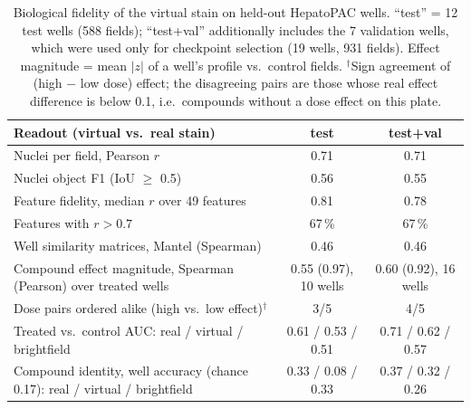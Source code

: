\documentclass[11pt,a4paper]{article}
\begin{document}
\begin{table}[H]
\centering\small
\caption{Biological fidelity of the virtual stain on held-out HepatoPAC wells. ``test'' = 12 test wells (588 fields); ``test+val'' additionally includes the 7 validation wells, which were used only for checkpoint selection (19 wells, 931 fields). Effect magnitude = mean $|z|$ of a well's profile vs.\ control fields. $^\dagger$Sign agreement of (high $-$ low dose) effect; the disagreeing pairs are those whose real effect difference is below 0.1, i.e.\ compounds without a dose effect on this plate.}
\label{tab:downstream}
\begin{tabular}{lcc}
\toprule
Readout (virtual vs.\ real stain) & test & test+val \\
\midrule
Nuclei per field, Pearson $r$ & 0.71 & 0.71 \\
Nuclei object F1 (IoU $\ge$ 0.5) & 0.56 & 0.55 \\
Feature fidelity, median $r$ over 49 features & 0.81 & 0.78 \\
Features with $r > 0.7$ & 67\,\% & 67\,\% \\
Well similarity matrices, Mantel (Spearman) & 0.46 & 0.46 \\
Compound effect magnitude, Spearman (Pearson) over treated wells & 0.55 (0.97), 10 wells & 0.60 (0.92), 16 wells \\
Dose pairs ordered alike (high vs.\ low effect)$^\dagger$ & 3/5 & 4/5 \\
Treated vs.\ control AUC: real / virtual / brightfield & 0.61 / 0.53 / 0.51 & 0.71 / 0.62 / 0.57 \\
Compound identity, well accuracy (chance 0.17): real / virtual / brightfield & 0.33 / 0.08 / 0.33 & 0.37 / 0.32 / 0.26 \\
\bottomrule
\end{tabular}
\end{table}
\end{document}
